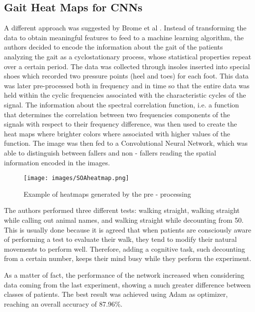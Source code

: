 \subsection{Gait Heat Maps for CNNs}
A different approach was suggested by Brome et al \cite{CycloStationary}. Instead of transforming the data to obtain meaningful features to feed to a machine learning algorithm, the authors decided to encode the information about the gait of the patients analyzing the gait as a cyclostationary process, whose statistical properties repeat over a certain period.
The data was collected through insoles inserted into special shoes which recorded two pressure points (heel and toes) for each foot. This data was later pre-processed both in frequency and in time so that the entire data was held within the cyclic frequencies associated with the characteristic cycles of the signal. 
The information about the spectral correlation function, i.e. a function that determines the correlation between two frequencies components of the signals with respect to their frequency difference, was then used to create the heat maps where brighter colors where associated with higher values of the function. The image was then fed to a Convolutional Neural Network, which was able to distinguish between fallers and non - fallers reading the spatial information encoded in the images.

\begin{figure}[ht!]
    \centering
    \texttt{[image: images/SOAheatmap.png]}
    \caption{Example of heatmaps generated by the pre - processing}
    \label{fig:SOAheatmap}
\end{figure}

The authors performed three different tests: walking straight, walking straight while calling out animal names, and walking straight while decounting from 50. This is usually done because it is agreed that when patients are consciously aware of performing a test to evaluate their walk, they tend to modify their natural movements to perform well. Therefore, adding a cognitive task, such decounting from a certain number, keeps their mind busy while they perform the experiment.

As a matter of fact, the performance of the network increased when considering data coming from the last experiment, showing a much greater difference between classes of patients. 
The best result was achieved using Adam as optimizer, reaching an overall accuracy of 87.96\%.

